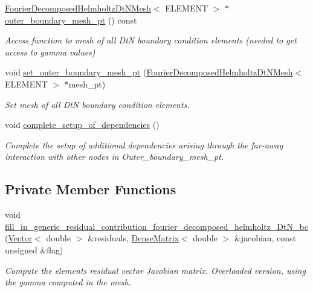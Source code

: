 \begin{DoxyCompactItemize}
\hyperlink{classoomph_1_1FourierDecomposedHelmholtzDtNMesh}{Fourier\+Decomposed\+Helmholtz\+Dt\+N\+Mesh}$<$ E\+L\+E\+M\+E\+NT $>$ $\ast$ \hyperlink{classoomph_1_1FourierDecomposedHelmholtzDtNBoundaryElement_aceac2fb059ea8969dd57e1817e3beefa}{outer\+\_\+boundary\+\_\+mesh\+\_\+pt} () const
\begin{DoxyCompactList}\small\item\em Access function to mesh of all DtN boundary condition elements (needed to get access to gamma values) \end{DoxyCompactList}\item 
void \hyperlink{classoomph_1_1FourierDecomposedHelmholtzDtNBoundaryElement_ac5f8ab5703f05b0e190906c98cb9339e}{set\+\_\+outer\+\_\+boundary\+\_\+mesh\+\_\+pt} (\hyperlink{classoomph_1_1FourierDecomposedHelmholtzDtNMesh}{Fourier\+Decomposed\+Helmholtz\+Dt\+N\+Mesh}$<$ E\+L\+E\+M\+E\+NT $>$ $\ast$mesh\+\_\+pt)
\begin{DoxyCompactList}\small\item\em Set mesh of all DtN boundary condition elements. \end{DoxyCompactList}\item 
void \hyperlink{classoomph_1_1FourierDecomposedHelmholtzDtNBoundaryElement_a7d8941de400e6f9497ae80ce24fee6cd}{complete\+\_\+setup\+\_\+of\+\_\+dependencies} ()
\begin{DoxyCompactList}\small\item\em Complete the setup of additional dependencies arising through the far-\/away interaction with other nodes in Outer\+\_\+boundary\+\_\+mesh\+\_\+pt. \end{DoxyCompactList}\end{DoxyCompactItemize}
\subsection*{Private Member Functions}
\begin{DoxyCompactItemize}
\item 
void \hyperlink{classoomph_1_1FourierDecomposedHelmholtzDtNBoundaryElement_a044d961d83a7d688f5e65ba91da751fa}{fill\+\_\+in\+\_\+generic\+\_\+residual\+\_\+contribution\+\_\+fourier\+\_\+decomposed\+\_\+helmholtz\+\_\+\+Dt\+N\+\_\+bc} (\hyperlink{classoomph_1_1Vector}{Vector}$<$ double $>$ \&residuals, \hyperlink{classoomph_1_1DenseMatrix}{Dense\+Matrix}$<$ double $>$ \&jacobian, const unsigned \&flag)
\begin{DoxyCompactList}\small\item\em Compute the element\textquotesingle{}s residual vector Jacobian matrix. Overloaded version, using the gamma computed in the mesh. \end{DoxyCompactList}\end{DoxyCompactItemize}
